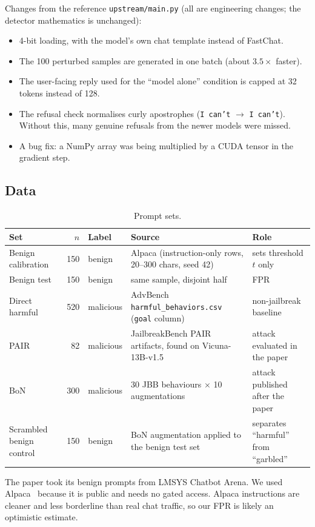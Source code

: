 \documentclass[11pt,a4paper]{article}
\newcommand{\code}[1]{\texttt{#1}}
\begin{document}
Changes from the reference \code{upstream/main.py} (all are engineering changes; the detector mathematics is unchanged):
\begin{itemize}
  \item 4-bit loading, with the model's own chat template instead of FastChat.
  \item The 100 perturbed samples are generated in one batch (about $3.5\times$ faster).
  \item The user-facing reply used for the ``model alone'' condition is capped at 32 tokens instead of 128.
  \item The refusal check normalises curly apostrophes (\code{I can’t} $\rightarrow$ \code{I can't}). Without this, many genuine refusals from the newer models were missed.
  \item A bug fix: a NumPy array was being multiplied by a CUDA tensor in the gradient step.
\end{itemize}

\subsection{Data}

\begin{table}[h]
\centering
\caption{Prompt sets.}
\small
\begin{tabular}{lrlp{4.6cm}p{3.2cm}}
\toprule
Set & $n$ & Label & Source & Role \\
\midrule
Benign calibration & 150 & benign & Alpaca (instruction-only rows, 20--300 chars, seed 42) & sets threshold $t$ only \\
Benign test & 150 & benign & same sample, disjoint half & FPR \\
Direct harmful & 520 & malicious & AdvBench \code{harmful\_behaviors.csv} (\code{goal} column) & non-jailbreak baseline \\
PAIR & 82 & malicious & JailbreakBench PAIR artifacts, found on Vicuna-13B-v1.5 & attack evaluated in the paper \\
BoN & 300 & malicious & 30 JBB behaviours $\times$ 10 augmentations & attack published after the paper \\
Scrambled benign control & 150 & benign & BoN augmentation applied to the benign test set & separates ``harmful'' from ``garbled'' \\
\bottomrule
\end{tabular}
\end{table}

The paper took its benign prompts from LMSYS Chatbot Arena. We used Alpaca~\cite{taori2023alpaca} because it is public and needs no gated access. Alpaca instructions are cleaner and less borderline than real chat traffic, so our FPR is likely an optimistic estimate.
\end{document}
